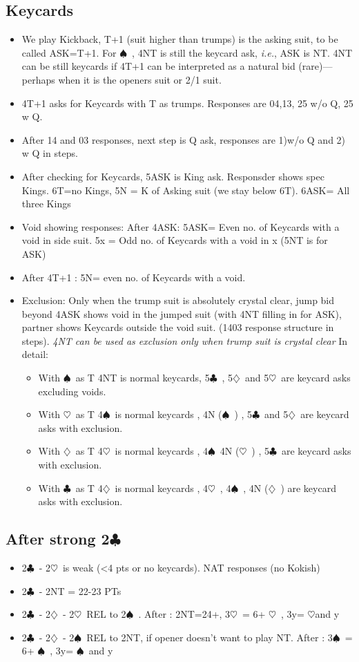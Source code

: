\documentclass{article}
\newcommand\C{\ensuremath{\clubsuit}}
\newcommand\D{\ensuremath{\diamondsuit}}
\renewcommand\H{\ensuremath{\heartsuit}}
\renewcommand\S{\ensuremath{\spadesuit}}
\begin{document}
\begin{multicols}{2}
  \subsection{Keycards}
  \label{kickback}
  \begin{itemize}
\item We play Kickback, T+1 (suit higher than trumps) is the asking suit, to be called ASK=T+1. For \S\ , 4NT is still the keycard ask, \textit{i.e.},  ASK is NT. 4NT can be still keycards if 4T+1 can be interpreted as a natural bid (rare)--- perhaps when it is the openers suit or 2/1 suit.
\item   4T+1 asks for Keycards with T as trumps. Responses are 04,13, 25 w/o Q, 25 w Q.
 \item After 14 and 03 responses, next step is Q ask, responses are 1)w/o Q and 2) w Q in steps.
 \item After checking for Keycards, 5ASK is King ask. Responsder shows spec Kings. 6T=no Kings, 5N = K of Asking suit (we stay below 6T). 6ASK= All three Kings
 \item Void showing responses: After 4ASK: 5ASK= Even no. of Keycards with a void in side suit. 5x = Odd no. of Keycards with a void in x (5NT is for ASK)
 \item After 4T+1 : 5N= even no. of Keycards with a void.
 \item Exclusion: Only when the trump suit is absolutely crystal clear, jump bid beyond 4ASK shows void in the jumped suit (with 4NT filling in for ASK), partner shows Keycards outside the void suit. (1403 response structure in steps). \emph{4NT can be used as exclusion only when trump suit is crystal clear}
   In detail: 
   \begin{itemize}
     \item With  \S\ as T 4NT is normal keycards, 5\C\ , 5\D\ and 5\H\ are keycard asks excluding voids.
     \item With \H\ as T 4\S\ is normal keycards , 4N (\S\ ) , 5\C\ and 5\D\ are keycard asks with exclusion.
     \item With \D\ as T 4\H\ is normal keycards , 4\S\ 4N (\H\ ) , 5\C\   are keycard asks with exclusion.
     \item With \C\ as T 4\D\ is normal keycards , 4\H\ , 4\S\ ,  4N (\D\ )    are keycard asks with exclusion.
     \end{itemize}
 \end{itemize}


 \subsection{After strong 2\C\ }
 \label{kokish}
 \begin{itemize}
   \item 2\C\ - 2\H\ is weak (<4 pts or no keycards). NAT responses (no Kokish)
   \item 2\C\ - 2NT = 22-23 PTs
   \item 2\C\ - 2\D\ - 2\H\ REL to 2\S\ .  After : 2NT=24+, 3\H\ = 6+ \H\ , 3y= \H and y
   \item 2\C\ - 2\D\ - 2\S\ REL to 2NT, if opener doesn't want to play NT. After :  3\S\ = 6+ \S\ , 3y= \S\ and y
   \end{itemize}

\end{multicols}
\end{document}
